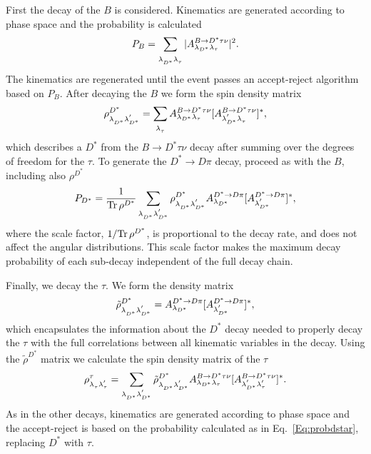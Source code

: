 First the decay of the $B$ is considered. Kinematics are generated
according to phase space and the probability is calculated
\begin{equation}
P_B=\sum_{\lambda^{\phantom '}_{D^*}\lambda^{\phantom '}_{\tau}}|\AmpB|^2.
\end{equation}
The kinematics are regenerated until the event 
passes an accept-reject algorithm based on $P_B$. 
After decaying the $B$ we form the spin density matrix
\begin{equation}
\rho^{D^*}_{\lambda^{\phantom '}_{D^*}\lambda^{'}_{D^*}}=\sum_{\lambda^{\phantom '}_{\tau}}\AmpB
[{A^{B\rightarrow D^*\tau\nu}_{\lambda^{'}_{D^*}\lambda^{\phantom '}_{\tau}}}]^*,
\end{equation}
which describes a $D^*$ from the $B \to D^* \tau \nu$ decay after summing over
the degrees of freedom for the $\tau$.
To generate the $D^* \to D \pi$ decay, proceed as with the $B$,
including also $\rho^{D^*}$
\begin{equation}
P_{D^*}=
{{1} \over {{\rm Tr}\,\rho^{D^*}}} 
\sum_{\lambda^{\phantom '}_{D^*} \lambda^{'}_{D^*}}
\rho^{D^*}_{\lambda^{\phantom '}_{D^*}\lambda^{'}_{D^*}} 
\AmpDstar
[{A^{D^*\rightarrow D\pi}_{\lambda^{'}_{D^*}}}]^*,
\label{Eq:probdstar}
\end{equation}
where the scale factor, $1/{\rm Tr}\,\rho^{D^*}$, 
is proportional to the decay rate, and does not affect the 
angular distributions.  This scale factor makes
the maximum decay probability of each sub-decay 
independent of the full decay chain.

Finally, we decay the $\tau$. We form the density matrix
\begin{equation}
\tilde\rho^{D^*}_{\lambda^{\phantom '}_{D^*}\lambda^{'}_{D^*}}=\AmpDstar
[{A^{D^*\rightarrow D\pi}_{\lambda^{'}_{D^*}}}]^*,
\end{equation}
which encapsulates the information about the $D^*$ decay
needed to properly decay the $\tau$ with the full correlations between
all kinematic variables in the decay. 
Using the $\tilde\rho^{D^*}$ matrix we calculate the spin density
matrix of the $\tau$
\begin{equation}
\rho^{\tau}_{\lambda^{\phantom '}_{\tau}\lambda^{'}_{\tau}}=\sum_{\lambda^{\phantom '}_{D^*}\lambda^{'}_{D^*}}
\tilde\rho^{D^*}_{\lambda^{\phantom '}_{D^*}\lambda^{'}_{D^*}}
\AmpB[{A^{B\rightarrow D^*\tau\nu}_{\lambda^{'}_{D^*}\lambda^{'}_{\tau}}}]^*.
\end{equation}
As in the other decays, kinematics are generated according to phase space
and the accept-reject is based on the probability calculated 
as in Eq.~\ref{Eq:probdstar}, replacing $D^*$ with $\tau$.


